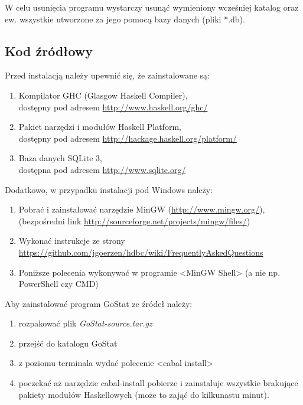 \documentclass[10pt,leqno]{article}
\begin{document}
W celu usunięcia programu wystarczy usunąć wymieniony wcześniej katalog oraz ew. wszystkie utworzone za jego pomocą bazy danych (pliki *.db).

\subsection{Kod źródłowy}
Przed instalacją należy upewnić się, że zainstalowane są:

\begin{enumerate}
\item Kompilator GHC (Glasgow Haskell Compiler), \\ dostępny pod adresem  \url{http://www.haskell.org/ghc/}
\item Pakiet narzędzi i modułów Haskell Platform, \\ dostępny pod adresem \url{http://hackage.haskell.org/platform/}
\item Baza danych SQLite 3, \\ dostępna pod adresem \url{http://www.sqlite.org/}
\end{enumerate}

\noindent Dodatkowo, w przypadku instalacji pod Windows należy:

\begin{enumerate}
\item Pobrać i zainstalować narzędzie MinGW (\url{http://www.mingw.org/}), \\ (bezpośredni link \url{http://sourceforge.net/projects/mingw/files/})
\item Wykonać instrukcje ze strony \url{https://github.com/jgoerzen/hdbc/wiki/FrequentlyAskedQuestions}
\item Poniższe polecenia wykonywać w programie <MinGW Shell> (a nie np. PowerShell czy CMD)
\end{enumerate}


\noindent Aby zainstalować program GoStat ze źródeł należy:

\begin{enumerate}
\item rozpakować plik \emph{GoStat-source.tar.gz}
\item przejść do katalogu GoStat
\item z poziomu terminala wydać polecenie <cabal install>
\item poczekać aż narzędzie cabal-install pobierze i zainstaluje wszystkie brakujące pakiety modułów Haskellowych (może to zająć do kilkunastu minut).
\end{enumerate}
\end{document}
